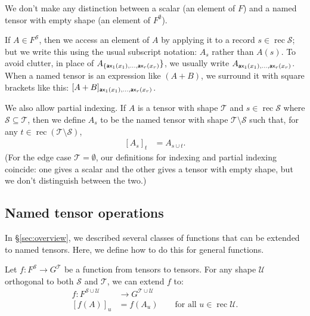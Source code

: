 \documentclass{article}
\DeclareMathOperator{\rec}{rec}
\begin{document}
We don't make any distinction between a scalar (an element of $F$) and a named tensor with empty shape (an element of $F^\emptyset$).

If $A \in F^{\mathcal{S}}$, then we access an element of $A$ by applying it to a record $s \in \rec \mathcal{S}$; but we write this using the usual subscript notation: $A_s$ rather than $A(s)$. To avoid clutter, in place of $A_{\{\mathsf{ax_\text{$1$}}(x_1), \ldots, \mathsf{ax_\text{$r$}}(x_r)}\}$, we usually write $A_{\mathsf{ax_\text{$1$}}(x_1), \ldots, \mathsf{ax_\text{$r$}}(x_r)}$. When a named tensor is an expression like $(A+B)$, we surround it with square brackets like this: $[A+B]_{\mathsf{ax_\text{$1$}}(x_1), \ldots, \mathsf{ax_\text{$r$}}(x_r)}$.

We also allow partial indexing. If $A$ is a tensor with shape $\mathcal{T}$ and $s \in \rec \mathcal{S}$ where $\mathcal{S} \subseteq \mathcal{T}$, then we define $A_s$ to be the named tensor with shape $\mathcal{T} \setminus \mathcal{S}$ such that, for any $t \in \rec (\mathcal{T} \setminus \mathcal{S})$,
\begin{align*}
\left[A_s\right]_t &= A_{s \cup t}.
\end{align*}
(For the edge case $\mathcal{T} = \emptyset$, our definitions for indexing and partial indexing coincide: one gives a scalar and the other gives a tensor with empty shape, but we don't distinguish between the two.)

\subsection{Named tensor operations}
\label{sec:tensorfunctions}

In \S\ref{sec:overview}, we described several classes of functions that can be extended to named tensors. Here, we define how to do this for general functions.

Let $f \colon F^{\mathcal{S}} \rightarrow G^{\mathcal{T}}$ be a function from tensors to tensors. For any shape $\mathcal{U}$ orthogonal to both $\mathcal{S}$ and $\mathcal{T}$, we can extend $f$ to:
\begin{align*}
f \colon F^{\mathcal{S} \cup \mathcal{U}} &\rightarrow G^{\mathcal{T} \cup \mathcal{U}} \\
[f(A)]_u &= f(A_u) \qquad \text{for all $u \in \rec\mathcal{U}$.}
\end{align*}
\end{document}
